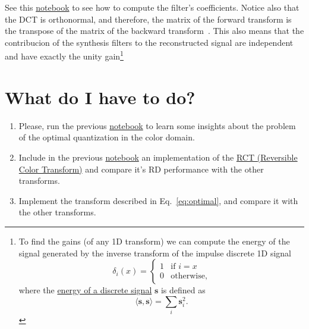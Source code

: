 See this
\href{https://github.com/Sistemas-Multimedia/Sistemas-Multimedia.github.io/blob/master/milestones/06-YUV_compression/color-DCT_matrix.ipynb}{notebook}
to see how to compute the filter's coefficients. Notice also that the
DCT is orthonormal, and therefore, the matrix of the forward transform
is the transpose of the matrix of the backward
transform~\cite{sayood2017introduction}. This also means that the
contribucion of the synthesis filters to the reconstructed signal are
independent and have exactly the unity gain\footnote{To find the gains (of any 1D transform) we can compute the
energy of the signal generated by the inverse transform of the impulse
discrete 1D signal
\begin{equation}
  \delta_{i}(x) = 
  \left\{
  \begin{array}{ll}
    1 & \text{if $i=x$}\\
    0 & \text{otherwise},
  \end{array}
  \right.
\end{equation}
where the
\href{https://en.wikipedia.org/wiki/Energy_(signal_processing)}{energy
  of a discrete signal} ${\mathbf s}$ is defined as
\begin{equation}
  \langle {\mathbf s}, {\mathbf s} \rangle =  \sum_{i}{{\mathbf s}_i^2}.
\end{equation}
}

\section{What do I have to do?}

\begin{enumerate}
\item Please, run the previous
  \href{https://github.com/Sistemas-Multimedia/Sistemas-Multimedia.github.io/blob/master/study_guide/06-color_transform/performance.ipynb}{notebook}
  to learn some insights about the problem of the optimal
  quantization in the color domain.
\item Include in the previous
  \href{https://github.com/Sistemas-Multimedia/Sistemas-Multimedia.github.io/blob/master/study_guide/06-color_transform/performance.ipynb}{notebook}
  an implementation of the
  \href{https://en.wikipedia.org/wiki/JPEG_2000#Color_components_transformation}{RCT
    (Reversible Color Transform)} and compare it's RD performance with
  the other transforms.
\item Implement the transform described in Eq.~\ref{eq:optimal}, and
  compare it with the other transforms.
\end{enumerate}

